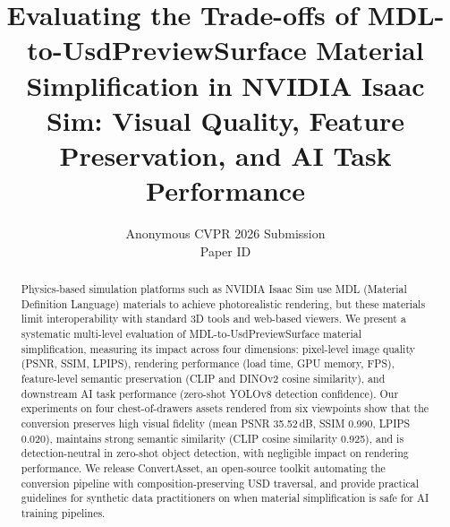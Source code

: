 \documentclass[10pt,twocolumn,letterpaper]{article}
\title{Evaluating the Trade-offs of MDL-to-UsdPreviewSurface Material
Simplification in NVIDIA Isaac Sim: Visual Quality, Feature Preservation,
and AI Task Performance}
\author{Anonymous CVPR 2026 Submission\\
Paper ID \cvprPaperID}
\begin{document}
\maketitle

\begin{abstract}
Physics-based simulation platforms such as NVIDIA Isaac Sim use MDL (Material
Definition Language) materials to achieve photorealistic rendering, but these
materials limit interoperability with standard 3D tools and web-based viewers.
We present a systematic multi-level evaluation of MDL-to-UsdPreviewSurface material
simplification, measuring its impact across four dimensions: pixel-level image
quality (PSNR, SSIM, LPIPS), rendering performance (load time, GPU memory, FPS),
feature-level semantic preservation (CLIP and DINOv2 cosine similarity), and
downstream AI task performance (zero-shot YOLOv8 detection confidence). Our
experiments on four chest-of-drawers assets rendered from six viewpoints show
that the conversion preserves high visual fidelity (mean PSNR 35.52\,dB, SSIM
0.990, LPIPS 0.020), maintains strong semantic similarity (CLIP cosine
similarity 0.925), and is detection-neutral in zero-shot object detection,
with negligible impact on rendering performance. We release ConvertAsset, an
open-source toolkit automating the conversion pipeline with
composition-preserving USD traversal, and provide practical guidelines for
synthetic data practitioners on when material simplification is safe for AI
training pipelines.
\end{abstract}








{\small


}
\end{document}
